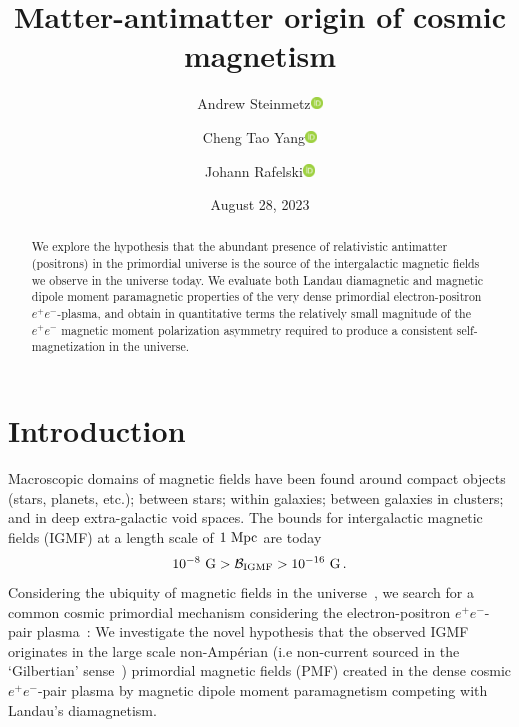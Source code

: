 \documentclass[aps,prd,floatfix,reprint]{revtex4-2}
\newcommand{\orcidicon}{\includegraphics[width=0.32cm]{orcid.pdf}}
\newcommand{\orc}[1]{\href{https://orcid.org/#1}{\orcidicon}}
\newcommand{\orcA}{0000-0001-8217-1484}
\newcommand{\orcB}{0000-0001-5038-8427}
\newcommand{\orcC}{0000-0001-5474-2649}
\begin{document}
\title{Matter-antimatter origin of cosmic magnetism}
\author{Andrew Steinmetz\orc{\orcC}}
\author{Cheng Tao Yang\orc{\orcB}}
\author{Johann Rafelski\orc{\orcA}}

\date{August 28, 2023}

\begin{abstract}
We explore the hypothesis that the abundant presence of relativistic antimatter (positrons) in the primordial universe is the source of the intergalactic magnetic fields we observe in the universe today. We evaluate both Landau diamagnetic and magnetic dipole moment paramagnetic properties of the very dense primordial electron-positron $e^{+}e^{-}$-plasma, and obtain in quantitative terms the relatively small magnitude of the $e^{+}e^{-}$ magnetic moment polarization asymmetry required to produce a consistent self-magnetization in the universe.
\end{abstract}


\maketitle

\section{Introduction}
\label{sec:introduction}
\noindent Macroscopic domains of magnetic fields have been found around compact objects (stars, planets, etc.); between stars; within galaxies; between galaxies in clusters; and in deep extra-galactic void spaces. The bounds for intergalactic magnetic fields (IGMF)  at a length scale of $1{\rm\ Mpc}$ are today~\cite{Neronov:2010gir,Taylor:2011bn,Pshirkov:2015tua,Jedamzik:2018itu,Vernstrom:2021hru}
\begin{align}
 \label{igmf}
 10^{-8}{\rm\ G}>\mathcal{B}_{\rm IGMF}>10^{-16}{\rm\ G}\,.
\end{align}
Considering the ubiquity of magnetic fields in the universe~\cite{Giovannini:2017rbc,Giovannini:2003yn,Kronberg:1993vk}, we search for a common cosmic primordial mechanism considering the electron-positron $e^{+}e^{-}$-pair plasma~\cite{Rafelski:2023emw,Grayson:2023flr}: We investigate the novel hypothesis that the observed IGMF originates in the large scale non-Amp\'erian (i.e non-current sourced in the `Gilbertian' sense~\cite{Rafelski:2017hce}) primordial magnetic fields (PMF) created in the dense cosmic $e^{+}e^{-}$-pair plasma by magnetic dipole moment paramagnetism competing with Landau's diamagnetism. 
\end{document}
